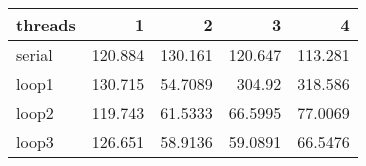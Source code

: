 \begin{tabular}{lrrrr}
\hline
 threads   &       1 &        2 &        3 &        4 \\
\hline
 serial    & 120.884 & 130.161  & 120.647  & 113.281  \\
 loop1     & 130.715 &  54.7089 & 304.92   & 318.586  \\
 loop2     & 119.743 &  61.5333 &  66.5995 &  77.0069 \\
 loop3     & 126.651 &  58.9136 &  59.0891 &  66.5476 \\
\hline
\end{tabular}
